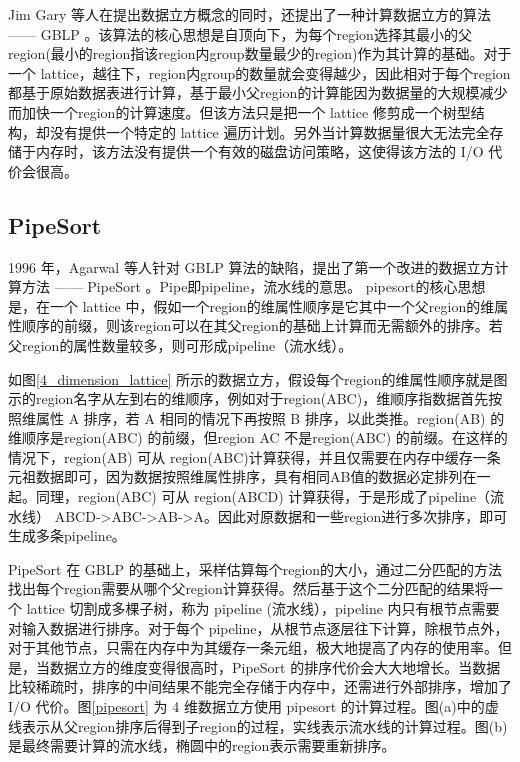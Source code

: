 Jim Gary 等人在提出数据立方概念的同时，还提出了一种计算数据立方的算法 —— GBLP \cite{gray1997data}。该算法的核心思想是自顶向下，为每个region选择其最小的父region(最小的region指该region内group数量最少的region)作为其计算的基础。对于一个 lattice，越往下，region内group的数量就会变得越少，因此相对于每个region都基于原始数据表进行计算，基于最小父region的计算能因为数据量的大规模减少而加快一个region的计算速度。但该方法只是把一个 lattice 修剪成一个树型结构，却没有提供一个特定的 lattice 遍历计划。另外当计算数据量很大无法完全存储于内存时，该方法没有提供一个有效的磁盘访问策略，这使得该方法的 I/O 代价会很高。

\subsection{PipeSort}

1996 年，Agarwal 等人针对 GBLP 算法的缺陷，提出了第一个改进的数据立方计算方法 —— PipeSort\cite{agarwal1996computation} 。Pipe即pipeline，流水线的意思。
pipesort的核心思想是，在一个 lattice 中，假如一个region的维属性顺序是它其中一个父region的维属性顺序的前缀，则该region可以在其父region的基础上计算而无需额外的排序。若父region的属性数量较多，则可形成pipeline（流水线）。

如图\ref{4_dimension_lattice} 所示的数据立方，假设每个region的维属性顺序就是图示的region名字从左到右的维顺序，例如对于region(ABC)，维顺序指数据首先按照维属性 A 排序，若 A 相同的情况下再按照 B 排序，以此类推。region(AB) 的维顺序是region(ABC) 的前缀，但region AC 不是region(ABC) 的前缀。在这样的情况下，region(AB) 可从 region(ABC)计算获得，并且仅需要在内存中缓存一条元祖数据即可，因为数据按照维属性排序，具有相同AB值的数据必定排列在一起。同理，region(ABC) 可从 region(ABCD) 计算获得，于是形成了pipeline（流水线） ABCD-\textgreater ABC-\textgreater AB-\textgreater A。因此对原数据和一些region进行多次排序，即可生成多条pipeline。

PipeSort 在 GBLP 的基础上，采样估算每个region的大小，通过二分匹配的方法找出每个region需要从哪个父region计算获得。然后基于这个二分匹配的结果将一个 lattice 切割成多棵子树，称为 pipeline (流水线），pipeline 内只有根节点需要对输入数据进行排序。对于每个 pipeline，从根节点逐层往下计算，除根节点外，对于其他节点，只需在内存中为其缓存一条元组，极大地提高了内存的使用率。但是，当数据立方的维度变得很高时，PipeSort 的排序代价会大大地增长。当数据比较稀疏时，排序的中间结果不能完全存储于内存中，还需进行外部排序，增加了 I/O 代价。图\ref{pipesort} 为 4 维数据立方使用 pipesort 的计算过程。图(a)中的虚线表示从父region排序后得到子region的过程，实线表示流水线的计算过程。图(b)是最终需要计算的流水线，椭圆中的region表示需要重新排序。


